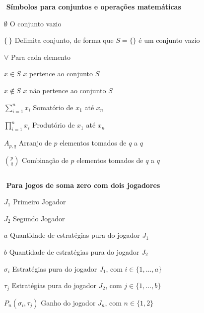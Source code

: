 \begin{simbolos}
	\item[$ $] \textbf{Símbolos para conjuntos e operações matemáticas}
	\item[$ \emptyset $] O conjunto vazio
	\item[$ \{\ \} $] Delimita conjunto, de forma que $S = \{\}$ é um conjunto vazio
	\item[$ \forall $] Para cada elemento
	\item[$ x\in S $] $x$ pertence ao conjunto $S$
	\item[$ x\notin S $] $x$ não pertence ao conjunto $S$
	\item[$ \displaystyle\sum_{i=1}^{n} x_i $] Somatório de $x_1$ até $x_n$
	\item[$ \displaystyle\prod_{i=1}^{n} x_i $] Produtório de $x_1$ até $x_n$
	\item[$ A_{p,q} $] Arranjo de $p$ elementos tomados de $q$ a $q$
	\item[$ \binom{p}{q} $] Combinação de $p$ elementos tomados de $q$ a $q$
	\item[$ $]

	\item[$ $] \textbf{Para jogos de soma zero com dois jogadores}
	\item[$ J_1 $] Primeiro Jogador
	\item[$ J_2 $] Segundo Jogador
	\item[$ a $]  Quantidade de estratégias pura do jogador $J_1$
	\item[$ b $]  Quantidade de estratégias pura do jogador $J_2$
	\item[$ \sigma_i $] Estratégias pura do jogador $J_1$, com $i \in \{1,\ldots,a\}$
	\item[$ \tau_j $] Estratégias pura do jogador $J_2$, com $j \in \{1,\ldots,b\}$
	\item[$ P_{n}(\sigma_i,\tau_j) $] Ganho do jogador $J_n$, com $n \in \{1,2\}$
	\item[$ $]

\end{simbolos}
